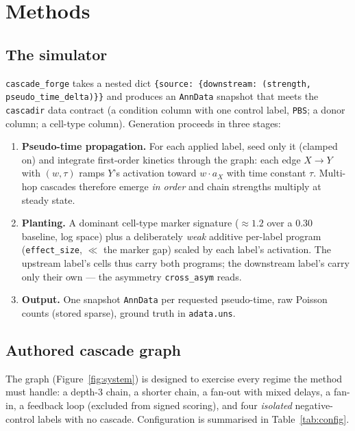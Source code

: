 \documentclass[11pt,a4paper]{article}
\begin{document}
\section{Methods}

\subsection{The simulator}
\texttt{cascade\_forge} takes a nested dict \texttt{\{source: \{downstream:
(strength, pseudo\_time\_delta)\}\}} and produces an \texttt{AnnData} snapshot that meets
the \texttt{cascadir} data contract (a condition column with one control label,
\texttt{PBS}; a donor column; a cell-type column). Generation proceeds in three stages:
\begin{enumerate}\itemsep2pt
  \item \textbf{Pseudo-time propagation.} For each applied label, seed only it (clamped
  on) and integrate first-order kinetics through the graph: each edge $X\!\to\!Y$ with
  $(w,\tau)$ ramps $Y$'s activation toward $w\cdot a_X$ with time constant $\tau$. Multi-hop
  cascades therefore emerge \emph{in order} and chain strengths multiply at steady state.
  \item \textbf{Planting.} A dominant cell-type marker signature ($\approx\!1.2$ over a
  $0.30$ baseline, log space) plus a deliberately \emph{weak} additive per-label program
  (\texttt{effect\_size}, $\ll$ the marker gap) scaled by each label's activation. The
  upstream label's cells thus carry both programs; the downstream label's carry only their
  own --- the asymmetry \texttt{cross\_asym} reads.
  \item \textbf{Output.} One snapshot \texttt{AnnData} per requested pseudo-time, raw
  Poisson counts (stored sparse), ground truth in \texttt{adata.uns}.
\end{enumerate}

\subsection{Authored cascade graph}
The graph (Figure~\ref{fig:system}) is designed to exercise every regime the method must
handle: a depth-3 chain, a shorter chain, a fan-out with mixed delays, a fan-in, a
feedback loop (excluded from signed scoring), and four \emph{isolated} negative-control
labels with no cascade. Configuration is summarised in Table~\ref{tab:config}.
\end{document}
